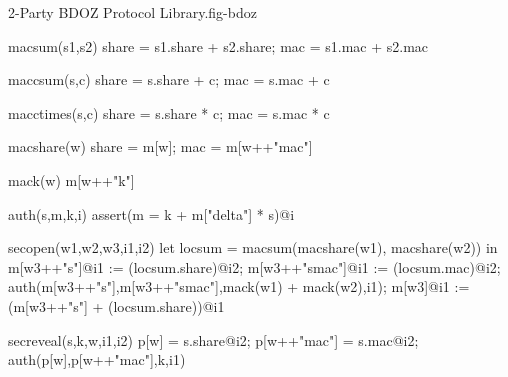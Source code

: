 \begin{fpfig}[t]{2-Party BDOZ Protocol Library.}{fig-bdoz}
{\footnotesize{
  \begin{verbatimtab}
    macsum(s1,s2)
    { { share = s1.share + s2.share; mac = s1.mac + s2.mac } }
    
    maccsum(s,c)
    { { share = s.share + c; mac = s.mac + c } }
    
    macctimes(s,c)
    { { share = s.share * c; mac = s.mac * c } }
    
    macshare(w) { {  share = m[w]; mac = m[w++"mac"] } }

    mack(w) { m[w++"k"] }
    
    auth(s,m,k,i) { assert(m = k + m["delta"] * s)@i }
    
    secopen(w1,w2,w3,i1,i2)
    {
      let locsum =  macsum(macshare(w1), macshare(w2)) in
      m[w3++"s"]@i1 := (locsum.share)@i2;
      m[w3++"smac"]@i1 := (locsum.mac)@i2;
      auth(m[w3++"s"],m[w3++"smac"],mack(w1) + mack(w2),i1);
      m[w3]@i1 := (m[w3++"s"] + (locsum.share))@i1
    }

    secreveal(s,k,w,i1,i2)
    {
      p[w] = s.share@i2;
      p[w++"mac"] = s.mac@i2;
      auth(p[w],p[w++"mac"],k,i1)    
    } \end{verbatimtab}
}}
\end{fpfig}


    
